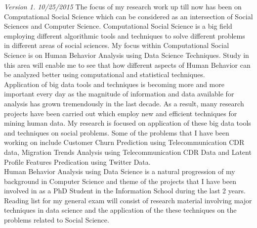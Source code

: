 \textit{Version 1. 10/25/2015}   
The focus of my research work up till now has been on Computational Social Science which can be considered as an intersection of Social Sciences and Computer Science. Computational Social Science is a big field employing different algorithmic tools and techniques to solve different problems in different areas of social sciences. My focus within Computational Social Science is on Human Behavior Analysis using Data Science Techniques. Study in this area will enable me to see that how different aspects of Human Behavior can be analyzed better using computational and statistical techniques.\\ 
Application of big data tools and techniques is becoming more and more important every day as the magnitude of information and data available for analysis has grown tremendously in the last decade. As a result, many research projects have been carried out which employ new and efficient techniques for mining human data. My research is focused on application of these big data tools and techniques on social problems. Some of the problems that I have been working on include Customer Churn Prediction using Telecommunication CDR data, Migration Trends Analysis using Telecommunication CDR Data and Latent Profile Features Predication using Twitter Data.\\ 

Human Behavior Analysis using Data Science is a natural progression of my background in Computer Science and theme of the projects that I have been involved in as a PhD Student in the Information School during the last 2 years.   Reading list for my general exam will consist of research material involving major techniques in data science and the application of the these techniques on the problems related to Social Science.   

